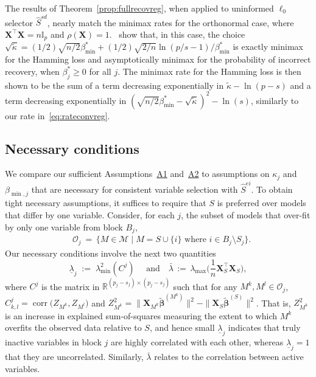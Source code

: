 \documentclass[
  12pt]{article}
\newcommand{\R}{\mathbb{R}}
\newcommand{\I}{\mathbb{I}}
\newcommand{\M}{\mathcal{M}}
\newcommand{\OO}{\mathcal{O}}
\newcommand{\bbeta}{\boldsymbol{\beta}}
\newcommand{\bX}{\mathbf{X}}
\begin{document}
The results of Theorem~\ref{prop:fullrecovreg}, when applied to uninformed $\ell_0$ selector $\hat{S}^{sd}$, nearly match the minimax rates for the orthonormal case, where $\bX^{\top}\bX=n\I_p$ and $\rho(\bX)=1$.~\cite{butucea2018} show that, in this case, the choice $\sqrt{\tilde{\kappa}}=(1/2)\sqrt{n/2}\beta_{\min}^*+(1/2)\sqrt{2/n}\ln(p/s-1)/\beta_{\min}^*$ is exactly minimax for the Hamming loss and asymptotically minimax for the probability of incorrect recovery, when $\beta_j^* \geq 0$ for all $j$. The minimax rate for the Hamming loss is then shown to be the sum of a term decreasing exponentially in $\tilde{\kappa}-\ln(p-s)$ and a term decreasing exponentially in $(\sqrt{n/2}\beta_{\min}^*-\sqrt{\tilde{\kappa}})^2-\ln(s)$, similarly to our rate in~\eqref{eq:rateconvreg}.

\subsection{Necessary conditions}
\label{ssec:necessary_conditions}
We compare our sufficient Assumptions~\hyperlink{lab:A1}{A1} and~\hyperlink{lab:A2}{A2} to assumptions on $\kappa_j$ and $\beta_{\min,j}$ that are necessary for consistent variable selection with $\hat{S}^{ei}$. To obtain tight necessary assumptions, it suffices to require that $S$ is preferred over models that differ by  one variable. Consider, for each $j$, the subset of models that over-fit by only one variable from block $B_j$,
\begin{align}
    &\OO_j \:=\,\{M\in \M\;|\; M=S\cup\{i\} \text{ where } i\in B_j\setminus S_j\} \label{eq:defOj}.
\end{align}
Our necessary conditions involve the next two quantities
\begin{equation}\label{eq:ovpsk}
\underline{\lambda}_j\;:=\;\lambda^2_{\min}(C^j) 
\quad\text{ and}\quad
\bar{\lambda}\,:=\,\lambda_{\max}\Big(\frac1n \bX_{S}^\top\bX_{S}\Big), 
\end{equation}
where $C^j$ is the matrix in $\R^{(p_j-s_j) \times (p_j-s_j)}$ such that for any $M^k,M^l \in \OO_j$, $C^j_{k,l}=\operatorname{corr}\big(Z_{M^k},Z_{M^l}\big)$ and $Z_{M^k}^2=\|\bX_{M^k}\tilde{\bbeta}^{(M^k)}\|^2-\|\bX_{S}\tilde{\bbeta}^{(S)}\|^2$. That is, $Z_{M^k}^2$ is an increase in explained sum-of-squares measuring the extent to which $M^k$ overfits the observed data relative to $S$,
and hence small $\underline{\lambda}_j$ indicates that truly inactive variables in block $j$ are highly correlated with each other, whereas $\underline{\lambda}_j=1$ that they are uncorrelated. Similarly, $\bar{\lambda}$ relates to the correlation between active variables. 
\end{document}
